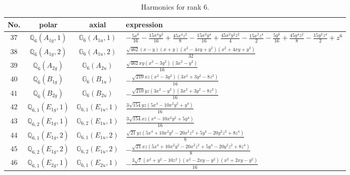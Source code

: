 \documentclass[fleqn,8pt,landscape]{jsarticle}
\begin{document}
\begin{table}[ht!]
\begin{center}
\caption{Harmonics for rank 6.}
\renewcommand{\arraystretch}{1.3}
\begin{tabular}{cccl} \hline \hline
No. & polar & axial & expression \\ \hline
$ 37 $ & $ \mathbb{Q}_{6}(A_{1g},1) $ & $ \mathbb{G}_{6}(A_{1u},1) $ & $ - \frac{5 x^{6}}{16} - \frac{15 x^{4} y^{2}}{16} + \frac{45 x^{4} z^{2}}{8} - \frac{15 x^{2} y^{4}}{16} + \frac{45 x^{2} y^{2} z^{2}}{4} - \frac{15 x^{2} z^{4}}{2} - \frac{5 y^{6}}{16} + \frac{45 y^{4} z^{2}}{8} - \frac{15 y^{2} z^{4}}{2} + z^{6} $ \\
$ 38 $ & $ \mathbb{Q}_{6}(A_{1g},2) $ & $ \mathbb{G}_{6}(A_{1u},2) $ & $ \frac{\sqrt{462} \left(x - y\right) \left(x + y\right) \left(x^{2} - 4 x y + y^{2}\right) \left(x^{2} + 4 x y + y^{2}\right)}{32} $ \\
$ 39 $ & $ \mathbb{Q}_{6}(A_{2g}) $ & $ \mathbb{G}_{6}(A_{2u}) $ & $ \frac{\sqrt{462} x y \left(x^{2} - 3 y^{2}\right) \left(3 x^{2} - y^{2}\right)}{16} $ \\
$ 40 $ & $ \mathbb{Q}_{6}(B_{1g}) $ & $ \mathbb{G}_{6}(B_{1u}) $ & $ - \frac{\sqrt{210} x z \left(x^{2} - 3 y^{2}\right) \left(3 x^{2} + 3 y^{2} - 8 z^{2}\right)}{16} $ \\
$ 41 $ & $ \mathbb{Q}_{6}(B_{2g}) $ & $ \mathbb{G}_{6}(B_{2u}) $ & $ - \frac{\sqrt{210} y z \left(3 x^{2} - y^{2}\right) \left(3 x^{2} + 3 y^{2} - 8 z^{2}\right)}{16} $ \\
$ 42 $ & $ \mathbb{Q}_{6,1}(E_{1g},1) $ & $ \mathbb{G}_{6,1}(E_{1u},1) $ & $ \frac{3 \sqrt{154} y z \left(5 x^{4} - 10 x^{2} y^{2} + y^{4}\right)}{16} $ \\
$ 43 $ & $ \mathbb{Q}_{6,2}(E_{1g},1) $ & $ \mathbb{G}_{6,2}(E_{1u},1) $ & $ \frac{3 \sqrt{154} x z \left(x^{4} - 10 x^{2} y^{2} + 5 y^{4}\right)}{16} $ \\
$ 44 $ & $ \mathbb{Q}_{6,1}(E_{1g},2) $ & $ \mathbb{G}_{6,1}(E_{1u},2) $ & $ \frac{\sqrt{21} y z \left(5 x^{4} + 10 x^{2} y^{2} - 20 x^{2} z^{2} + 5 y^{4} - 20 y^{2} z^{2} + 8 z^{4}\right)}{8} $ \\
$ 45 $ & $ \mathbb{Q}_{6,2}(E_{1g},2) $ & $ \mathbb{G}_{6,2}(E_{1u},2) $ & $ - \frac{\sqrt{21} x z \left(5 x^{4} + 10 x^{2} y^{2} - 20 x^{2} z^{2} + 5 y^{4} - 20 y^{2} z^{2} + 8 z^{4}\right)}{8} $ \\
$ 46 $ & $ \mathbb{Q}_{6,1}(E_{2g},1) $ & $ \mathbb{G}_{6,1}(E_{2u},1) $ & $ - \frac{3 \sqrt{7} \left(x^{2} + y^{2} - 10 z^{2}\right) \left(x^{2} - 2 x y - y^{2}\right) \left(x^{2} + 2 x y - y^{2}\right)}{16} $ \\

\end{tabular}
\end{center}
\end{table}
\end{document}
